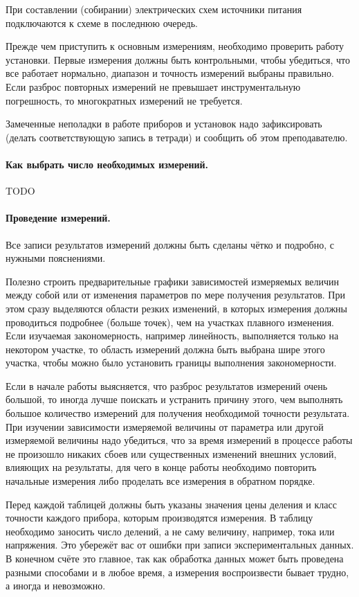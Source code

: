 \documentclass[10pt]{article}
\begin{document}
При составлении (собирании) электрических схем источники питания подключаются
к схеме в последнюю очередь.

Прежде чем приступить к основным измерениям, необходимо проверить
работу установки. Первые измерения должны быть контрольными, чтобы
убедиться, что все работает нормально, диапазон и точность измерений
выбраны правильно. Если разброс повторных измерений не превышает инструментальную
погрешность, то многократных измерений не требуется.

Замеченные неполадки в работе приборов и установок надо зафиксировать
(делать соответствующую запись в тетради) и сообщить об этом преподавателю.%


\paragraph{Как выбрать число необходимых измерений.}

TODO

\paragraph{Проведение измерений.}

Все записи результатов измерений должны быть сделаны чётко и подробно,
с нужными пояснениями.

Полезно строить предварительные графики зависимостей измеряемых величин
между собой или от изменения параметров по мере получения результатов.
При этом сразу выделяются области резких изменений, в которых измерения
должны проводиться подробнее (больше точек), чем на участках плавного
изменения. Если изучаемая закономерность, например линейность, выполняется
только на некотором участке, то область измерений должна быть выбрана
шире этого участка, чтобы можно было установить границы выполнения
закономерности.

Если в начале работы выясняется, что разброс результатов измерений
очень большой, то иногда лучше поискать и устранить причину этого,
чем выполнять большое количество измерений для получения необходимой
точности результата. При изучении зависимости измеряемой величины
от параметра или другой измеряемой величины надо убедиться, что за
время измерений в процессе работы не произошло никаких сбоев или существенных
изменений внешних условий, влияющих на результаты, для чего в конце
работы необходимо повторить начальные измерения либо проделать все
измерения в обратном порядке.

Перед каждой таблицей должны быть указаны значения цены деления и
класс точности каждого прибора, которым производятся измерения. В
таблицу необходимо заносить число делений, а не саму величину, например,
тока или напряжения. Это убережёт вас от ошибки при записи экспериментальных
данных. В конечном счёте это главное, так как обработка данных может
быть проведена разными способами и в любое время, а измерения воспроизвести
бывает трудно, а иногда и невозможно.%
\end{document}
